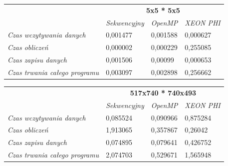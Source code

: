 \documentclass[a4paper]{article}
\begin{document}
\begin{table}[ht!]
\begin{tabular}{l|l|l|l|}
\cline{2-4}
                                                            & \multicolumn{3}{|c|}{\textbf{5x5 * 5x5}}                   \\ \cline{2-4} 
                                                            & \textit{Sekwencyjny} & \textit{OpenMP} & \textit{XEON PHI} \\ \hline
\multicolumn{1}{|l|}{\textit{Czas wczytywania danych}}      & 0,001477             & 0,001588        & 0,000627          \\ \hline
\multicolumn{1}{|l|}{\textit{Czas obliczeń}}                & 0,000002             & 0,000229        & 0,255085          \\ \hline
\multicolumn{1}{|l|}{\textit{Czas zapisu danych}}           & 0,001506             & 0,00099         & 0,000653          \\ \hline
\multicolumn{1}{|l|}{\textit{Czas trwania całego programu}} & 0,003097             & 0,002898        & 0,256662          \\ \hline
\end{tabular}
\end{table}

\begin{table}
\begin{tabular}{l|l|l|l|}
\cline{2-4}
                                                            & \multicolumn{3}{|c|}{\textbf{517x740 * 740x493}}           \\ \cline{2-4} 
                                                            & \textit{Sekwencyjny} & \textit{OpenMP} & \textit{XEON PHI} \\ \hline
\multicolumn{1}{|l|}{\textit{Czas wczytywania danych}}      & 0,085524             & 0,090966        & 0,875284          \\ \hline
\multicolumn{1}{|l|}{\textit{Czas obliczeń}}                & 1,913065             & 0,357867        & 0,26042           \\ \hline
\multicolumn{1}{|l|}{\textit{Czas zapisu danych}}           & 0,074895             & 0,079641        & 0,426752          \\ \hline
\multicolumn{1}{|l|}{\textit{Czas trwania całego programu}} & 2,074703             & 0,529671        & 1,565948          \\ \hline
\end{tabular}
\end{table}
\end{document}
